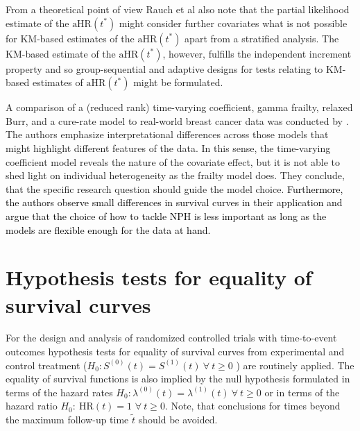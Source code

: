 \documentclass{article}
\newcommand{\NEW}[2][black]{\textcolor{#1}{#2}}
\begin{document}
\noindent From a theoretical point of view Rauch et al \cite{Rauch.2018} also note that the partial likelihood estimate of the $\text{aHR}(t^*)$ might consider further covariates what is not possible for KM-based estimates of the $\text{aHR}(t^*)$ apart from a stratified analysis. 
The KM-based estimate of the $\text{aHR}(t^*)$, however, fulfills the independent increment property and so group-sequential and adaptive designs for tests relating to KM-based estimates of $\text{aHR}(t^*)$ might be formulated.

\noindent A comparison of a (reduced rank) time-varying coefficient, gamma frailty, relaxed Burr, and a cure-rate model to real-world breast cancer data was conducted by \cite{Perperoglou.2007}. 
The authors emphasize interpretational differences across those models that might highlight different features of the data. 
In this sense, the time-varying coefficient model reveals the nature of the covariate effect, but it is not able to shed light on individual heterogeneity as the frailty model does. 
They conclude, that the specific research question should guide the model choice.
\NEW{Furthermore, the authors observe small differences in survival curves in their application and argue that the choice of how to tackle NPH is less important as long as the models are flexible enough for the data at hand.}

\section{Hypothesis tests for equality of survival curves} \label{test}

\noindent \textbf{}

\noindent For the design and analysis of randomized controlled trials with time-to-event outcomes hypothesis tests for equality of survival curves from experimental and control treatment ($H_0:S^{\left(0\right)}\left(t\right)=S^{\left(1\right)}\left(t\right)\ \forall \ t\ge 0$ ) are routinely applied. The equality of survival functions is also implied by the null hypothesis formulated in terms of the hazard rates $H_0:{\lambda }^{\left(0\right)}\left(t\right)={\lambda }^{\left(1\right)}\left(t\right)\ \forall \ t\ge 0$ or in terms of the hazard ratio $H_0:\ \text{HR}(t)=1$ $\forall \ t\ge 0$. Note, that conclusions for times beyond the maximum follow-up time $\tilde{t}$ should be avoided.
\end{document}
